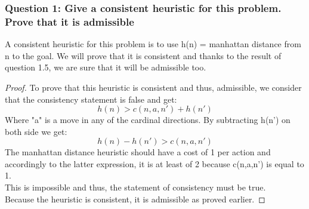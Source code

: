 \documentclass[a4paper,10pt]{article}
\begin{document}
			\subsubsection{Question 1: Give a consistent heuristic for this problem. Prove that it is admissible}
				A consistent heuristic for this problem is to use h(n) = manhattan distance from n to the goal. We will prove that it is consistent and thanks to the result of question 1.5, we are sure that it will be admissible too.
				\begin{proof}
					To prove that this heuristic is consistent and thus, admissible, we consider that the consistency statement is false and get:
					$$ h(n) > c(n,a,n') + h(n') $$
					Where "a" is a move in any of the cardinal directions.
					By subtracting h(n') on both side we get:
					$$ h(n) - h(n') > c(n,a,n') $$
					The manhattan distance heuristic should have a cost of 1 per action and accordingly to the latter expression, it is at least of 2 because c(n,a,n') is equal to 1.\\
					This is impossible and thus, the statement of consistency must be true.\\
					Because the heuristic is consistent, it is admissible as proved earlier.   
				\end{proof}  				
				
\end{document}
